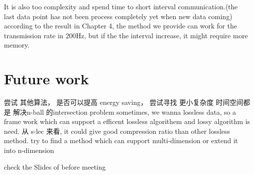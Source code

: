 It is also too complexity and spend time to short interval communication.(the last data point has not been process completely yet when new data coming)
according to the result in Chapter 4, the method we provide can work for the transmission rate in 200Hz, but if the the interval increase, it might require more memory.


\section{Future work}

尝试 其他算法， 是否可以提高 energy saving， 尝试寻找 更小复杂度 时间空间都是 解决n-ball 的intersection problem
sometimes, we wanna lossless data, so a frame work which can support a efficent lossless algorithem and lossy algorithm is need. 
从 s-lec 来看, it could give good compression ratio than other lossless method.
try to find a method which can support multi-dimension or extend it into n-dimension

check the Slides of before meeting 
